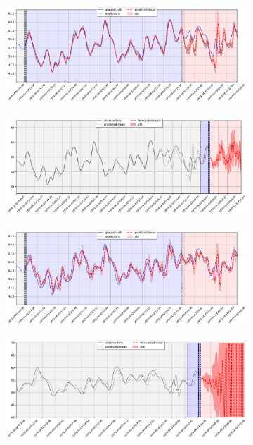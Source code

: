 \documentclass{article}
\begin{document}
\begin{figure}
  \begin{subfigure}{0.5\textwidth}
    \centering
    \includegraphics[scale=0.17]{figures/trainCO2_biGRU_ep120_hs128_nl3_ws12_g2_ph3}
    \caption{}
    \label{fig:fc}
  \end{subfigure}%
  \begin{subfigure}{0.5\textwidth}
    \centering
    \includegraphics[scale=0.17]{figures/forecastCO2_biGRU_ep120_hs128_nl3_ws12_g2_ph3}
    \caption{}
    \label{fig:fd}
  \end{subfigure}


  \begin{subfigure}{0.5\textwidth}
    \centering
    \includegraphics[scale=0.17]{figures/trainCO2_arima_p12_q1_d0_ws12_g2_ph3}
    \caption{}
    \label{fig:fe}
  \end{subfigure}%
  \begin{subfigure}{0.5\textwidth}
    \centering
    \includegraphics[scale=0.17]{figures/forecastCO2_arima_p12_q1_d0_ws12_g2_ph3}
    \caption{}
    \label{fig:ff}
  \end{subfigure}



\end{figure}
\end{document}
